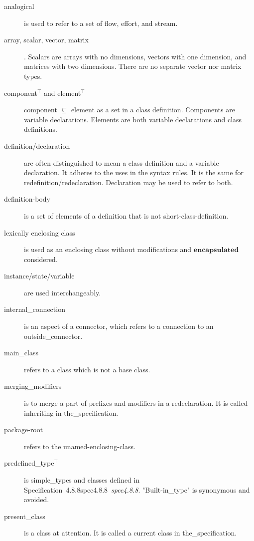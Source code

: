 \documentclass[10pt,b5paper]{article}
\def\specrefx#1#2{Specification~#1\ifx\relax#2\relax{}\else~{\it{}#2}\fi}
\def\specref#1{\specrefx{#1}{\csname spec#1\endcsname}}
\begin{document}
\begin{description}

\item [analogical] is used to refer to a set of flow, effort, and
stream.

\item [array, scalar, vector, matrix].  Scalars are arrays with no
dimensions, vectors with one dimension, and matrices with two
dimensions.  There are no separate vector nor matrix types.

\item [component{$^\top$} {\rm{}and} element{$^\top$}] component
{$\subseteq$} element as a set in a class definition.  Components are
variable declarations.  Elements are both variable declarations and
class definitions.

\item [definition/declaration] are often distinguished to mean a class
definition and a variable declaration.  It adheres to the uses in the
syntax rules.  It is the same for redefinition/redeclaration.
Declaration may be used to refer to both.

\item [definition-body] is a set of elements of a definition that is
not short-class-definition.

\item [lexically enclosing class] is used as an enclosing class
without modifications and $\mathbf{encapsulated}$ considered.

\item [instance/state/variable] are used interchangeably.

\item [internal_connection] is an aspect of a connector, which refers
to a connection to an outside_connector.

\item [main_class] refers to a class which is not a base class.

\item [merging_modifiers] is to merge a part of prefixes and modifiers
in a redeclaration.  It is called inheriting in the_specification.

\item [package-root] refers to the unamed-enclosing-class.

\item [predefined_type{$\mbox{}^\top$}] is simple_types and classes
defined in \specref{4.8.8}.  "Built-in_type" is synonymous and
avoided.

\item [present_class] is a class at attention.  It is called a current
class in the_specification.


\end{description}
\end{document}
